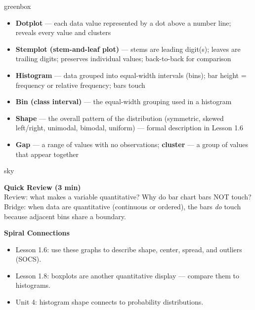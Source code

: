 \documentclass[10pt]{article}
\begin{document}
\begin{skillbox}{greenbox}
\begin{minipage}[t]{0.48\linewidth}
    \begin{itemize}
        \item \textbf{Dotplot} --- each data value represented by a dot above a number line; reveals every value and clusters
        \item \textbf{Stemplot (stem-and-leaf plot)} --- stems are leading digit(s); leaves are trailing digits; preserves individual values; back-to-back for comparison
        \item \textbf{Histogram} --- data grouped into equal-width intervals (bins); bar height = frequency or relative frequency; bars touch
    \end{itemize}
\end{minipage}
\hfill
\begin{minipage}[t]{0.48\linewidth}
    \begin{itemize}
        \item \textbf{Bin (class interval)} --- the equal-width grouping used in a histogram
        \item \textbf{Shape} --- the overall pattern of the distribution (symmetric, skewed left/right, unimodal, bimodal, uniform) --- formal description in Lesson 1.6
        \item \textbf{Gap} --- a range of values with no observations; \textbf{cluster} --- a group of values that appear together
    \end{itemize}
\end{minipage}
\end{skillbox}

\begin{skillbox}{sky}
\begin{minipage}[t]{0.48\linewidth}
    \textbf{Quick Review (3 min)}\\
    Review: what makes a variable quantitative? Why do bar chart bars NOT touch? Bridge: when data are quantitative (continuous or ordered), the bars \textit{do} touch because adjacent bins share a boundary.
\end{minipage}
\hfill
\begin{minipage}[t]{0.48\linewidth}
    \textbf{Spiral Connections}
    \begin{itemize}
        \item Lesson 1.6: use these graphs to describe shape, center, spread, and outliers (SOCS).
        \item Lesson 1.8: boxplots are another quantitative display --- compare them to histograms.
        \item Unit 4: histogram shape connects to probability distributions.
    \end{itemize}
\end{minipage}
\end{skillbox}
\end{document}
